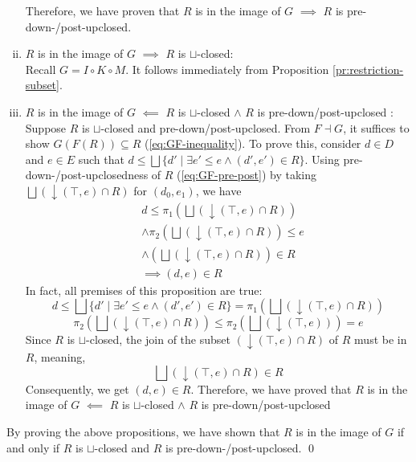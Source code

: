 \documentclass{llncs}
\newcommand{\join}{\sqcup}
\newcommand{\bigjoin}{\bigsqcup}
\newcommand{\comp}{\circ}
\begin{document}
\begin{enumerate}[i.]
  Therefore, we have proven that $R$ is in the image of $G$ $\implies$ $R$ is pre-down-/post-upclosed.

\item{$R$ is in the image of $G$ $\implies$ $R$ is $\join$-closed:}\\
  Recall $G = I \comp K \comp M$. It follows immediately from Proposition \ref{pr:restriction-subset}.
\item{$R$ is in the image of $G$ $\impliedby$ $R$ is $\join$-closed $\land$ $R$ is pre-down/post-upclosed :}\\
  Suppose $R$ is $\join$-closed and pre-down/post-upclosed.
  From $F \dashv G$, it suffices to show $G(F(R)) \subseteq R$ (\ref{eq:GF-inequality}).
  To prove this, consider $d \in D$ and $e \in E$ such that $d \leq \bigjoin \{d' \mid \exists e' \leq e \land (d' , e') \in R \}$.
  Using pre-down-/post-upclosedness of $R$ (\ref{eq:GF-pre-post}) by taking $\bigjoin (\downarrow (\top , e) \cap R)$ for $(d_0 , e_1)$, we have
  \begin{align*}
    &d \leq \pi_{1} (\bigjoin (\downarrow (\top , e) \cap R)) \\
    &\land \pi_{2} (\bigjoin (\downarrow (\top , e) \cap R)) \leq e\\
    &\land (\bigjoin (\downarrow (\top , e) \cap R)) \in R\\
    &\implies (d, e) \in R
  \end{align*}
  In fact, all premises of this proposition are true:
  \begin{equation}
     d \leq \bigjoin \{d' \mid \exists e' \leq e \land (d' , e') \in R \} = \pi_{1} (\bigjoin (\downarrow (\top , e) \cap R))
  \end{equation}
  \begin{equation}
     \pi_{2} (\bigjoin (\downarrow (\top , e) \cap R)) \leq \pi_{2} (\bigjoin (\downarrow (\top , e))) = e
  \end{equation}
   Since $R$ is $\join$-closed, the join of the subset $(\downarrow (\top , e) \cap R)$ of $R$ must be in $R$, meaning,
  \begin{equation*} \bigjoin (\downarrow (\top , e) \cap R) \in R
  \end{equation*}
  Consequently, we get $(d, e) \in R$.
  Therefore, we have proved that $R$ is in the image of $G$ $\impliedby$ $R$ is $\join$-closed $\land$ $R$ is pre-down/post-upclosed
\end{enumerate}
By proving the above propositions, we have shown that $R$ is in the image of $G$ if and only if $R$ is $\join$-closed and $R$ is pre-down-/post-upclosed. \qed
\end{document}
